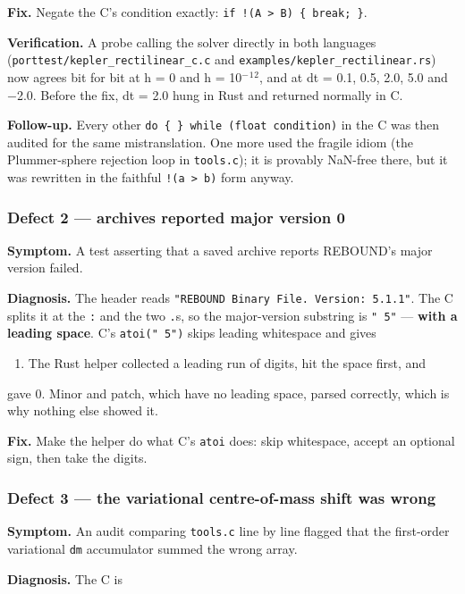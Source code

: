 \documentclass[11pt]{article}
\begin{document}
\textbf{Fix.} Negate the C's condition exactly: \texttt{if !(A > B) \{ break; \}}.

\textbf{Verification.} A probe calling the solver directly in both languages (\texttt{porttest/kepler\_rectilinear\_c.c} and \texttt{examples/kepler\_rectilinear.rs}) now agrees bit for bit at h = 0 and h = 10\(^{-}\)\(^{1}\)\(^{2}\), and at dt = 0.1, 0.5, 2.0, 5.0 and \(-\)2.0. Before the fix, dt = 2.0 hung in Rust and returned normally in C.

\textbf{Follow-up.} Every other \texttt{do \{ \} while (float condition)} in the C was then audited for the same mistranslation. One more used the fragile idiom (the Plummer-sphere rejection loop in \texttt{tools.c}); it is provably NaN-free there, but it was rewritten in the faithful \texttt{!(a > b)} form anyway.

\subsubsection{Defect 2 --- archives reported major version 0}

\textbf{Symptom.} A test asserting that a saved archive reports REBOUND's major version failed.

\textbf{Diagnosis.} The header reads \texttt{"REBOUND Binary File. Version: 5.1.1"}. The C splits it at the \texttt{:} and the two \texttt{.}s, so the major-version substring is \texttt{" 5"} --- \textbf{with a leading space}. C's \texttt{atoi(" 5")} skips leading whitespace and gives
\begin{enumerate}
\item The Rust helper collected a leading run of digits, hit the space first, and
\end{enumerate}
gave 0. Minor and patch, which have no leading space, parsed correctly, which is why nothing else showed it.

\textbf{Fix.} Make the helper do what C's \texttt{atoi} does: skip whitespace, accept an optional sign, then take the digits.

\subsubsection{Defect 3 --- the variational centre-of-mass shift was wrong}

\textbf{Symptom.} An audit comparing \texttt{tools.c} line by line flagged that the first-order variational \texttt{dm} accumulator summed the wrong array.

\textbf{Diagnosis.} The C is
\end{document}
